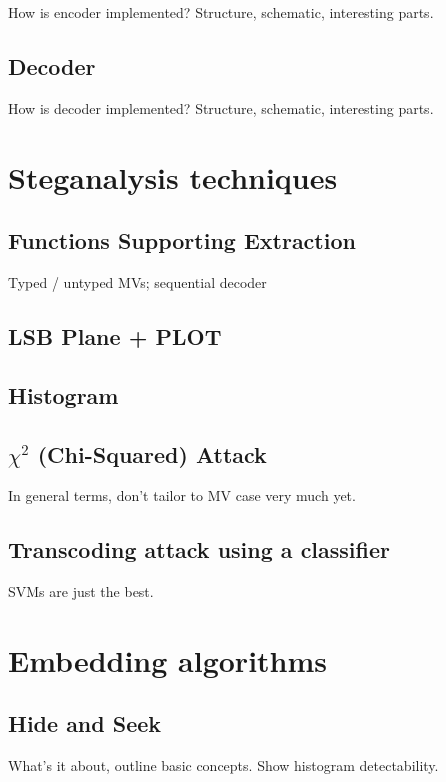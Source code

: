 \documentclass[12pt,british,twoside,notitlepage,usenames,dvipsnames,hypens,final]{report}
\numberwithin{equation}{section}
\numberwithin{figure}{section}
\begin{document}
How is encoder implemented? Structure, schematic, interesting parts. 

\subsection{Decoder}

How is decoder implemented? Structure, schematic, interesting parts. 

\section{Steganalysis techniques}

\subsection{Functions Supporting Extraction}

Typed / untyped MVs; sequential decoder

\subsection{LSB Plane + PLOT}

\subsection{Histogram}

\subsection{$\chi^2$ (Chi-Squared) Attack}

In general terms, don't tailor to MV case very much yet.

\subsection{Transcoding attack using a classifier}
SVMs are just the best.

\section{Embedding algorithms}

\subsection{Hide and Seek}

What's it about, outline basic concepts. Show histogram detectability.
\end{document}
